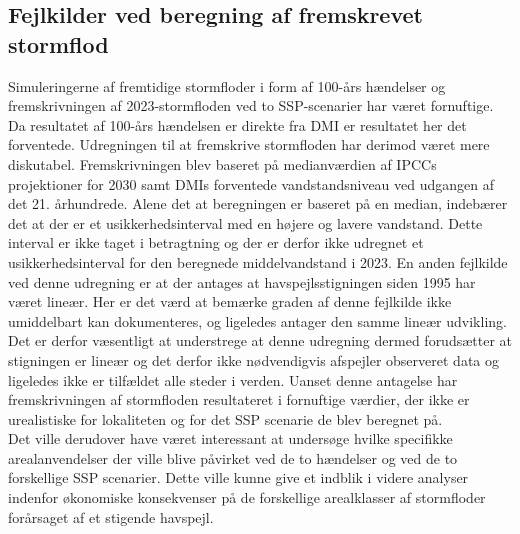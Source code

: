 \subsection{Fejlkilder ved beregning af fremskrevet stormflod}
Simuleringerne af fremtidige stormfloder i form af 100-års hændelser og fremskrivningen af 2023-stormfloden ved to SSP-scenarier har været fornuftige. Da resultatet af 100-års hændelsen er direkte fra DMI er resultatet her det forventede. Udregningen til at fremskrive stormfloden har derimod været mere diskutabel. Fremskrivningen blev baseret på medianværdien af IPCCs projektioner for 2030 samt DMIs forventede vandstandsniveau ved udgangen af det 21. århundrede. Alene det at beregningen er baseret på en median, indebærer det at der er et usikkerhedsinterval med en højere og lavere vandstand. Dette interval er ikke taget i betragtning og der er derfor ikke udregnet et usikkerhedsinterval for den beregnede middelvandstand i 2023. En anden fejlkilde ved denne udregning er at der antages at havspejlsstigningen siden 1995 har været lineær. Her er det værd at bemærke graden af denne fejlkilde ikke umiddelbart kan dokumenteres, og \cite{danish_meteorological_institute_dmi_2024} ligeledes antager den samme lineær udvikling. Det er derfor væsentligt at understrege at denne udregning dermed forudsætter at stigningen er lineær og det derfor ikke nødvendigvis afspejler observeret data og ligeledes ikke er tilfældet alle steder i verden. Uanset denne antagelse har fremskrivningen af stormfloden resultateret i fornuftige værdier, der ikke er urealistiske for lokaliteten og for det SSP scenarie de blev beregnet på. \\
Det ville derudover have været interessant at undersøge hvilke specifikke arealanvendelser der ville blive påvirket ved de to hændelser og ved de to forskellige SSP scenarier. Dette ville kunne give et indblik i videre analyser indenfor økonomiske konsekvenser på de forskellige arealklasser af stormfloder forårsaget af et stigende havspejl. 


